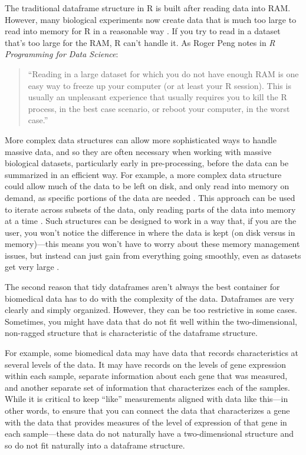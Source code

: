 \documentclass[]{tufte-book}
\begin{document}
The traditional dataframe structure in R is built after
reading data into RAM. However, many biological experiments now create
data that is much too large to read into memory for R in a reasonable way
\citep{lawrence2014scalable, hicks2021mbkmeans}. If you try to read in a dataset
that's too large for the RAM, R can't handle it. As Roger Peng notes in
\emph{R Programming for Data Science}:

\begin{quote}
``Reading in a large dataset for which you do not have enough RAM is one easy
way to freeze up your computer (or at least your R session). This is usually an
unpleasant experience that usually requires you to kill the R process, in the
best case scenario, or reboot your computer, in the worst case.'' \citep{peng2016r}
\end{quote}

More complex data structures can allow more sophisticated ways to handle massive
data, and so they are often necessary when working with massive biological
datasets, particularly early in pre-processing, before the data can be
summarized in an efficient way. For example, a more complex data structure could
allow much of the data to be left on disk, and only read into memory on demand,
as specific portions of the data are needed \citep{gatto2013msnbase, hicks2021mbkmeans}. This approach can be used to iterate across subsets of the
data, only reading parts of the data into memory at a time
\citep{lawrence2014scalable}. Such structures can be designed to work in a way that,
if you are the user, you won't notice the difference in where the data is kept
(on disk versus in memory)---this means you won't have to worry about these
memory management issues, but instead can just gain from everything going
smoothly, even as datasets get very large \citep{gatto2013msnbase}.

The second reason that tidy dataframes aren't always the best container for
biomedical data has to do with the complexity of the data. Dataframes are very
clearly and simply organized. However, they can be too restrictive in some
cases. Sometimes, you might have data that do not fit well within the
two-dimensional, non-ragged structure that is characteristic of the dataframe
structure.

For example, some biomedical data may have data that records characteristics at
several levels of the data. It may have records on the levels of gene expression
within each sample, separate information about each gene that was measured, and
another separate set of information that characterizes each of the samples.
While it is critical to keep ``like'' measurements aligned with data like
this---in other words, to ensure that you can connect the data that
characterizes a gene with the data that provides measures of the level of
expression of that gene in each sample---these data do not naturally have a
two-dimensional structure and so do not fit naturally into a dataframe
structure.
\end{document}
